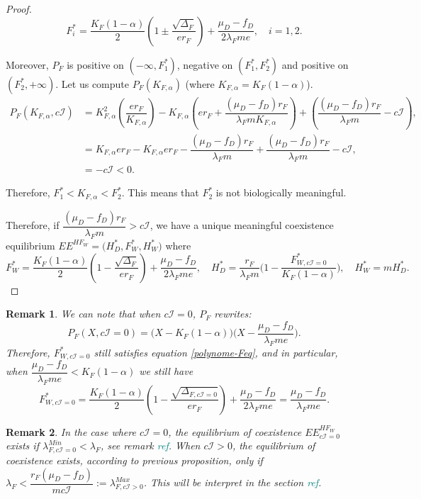 \documentclass{article}
\newcommand{\lfw}{\lambda_{F}}
\newcommand{\lfw}{\lambda_{F}}
\newcommand{\marc}[1]{\textcolor{teal}{#1}}
\newtheorem{remark}{Remark}
\begin{document}
\begin{proof}
\begin{equation*}
F_i^* = \dfrac{K_F(1-\alpha)}{2}\left(1 \pm \dfrac{\sqrt{\Delta_F}}{er_F}\right) + \dfrac{\mu_D - f_D}{2\lfw m e}, \quad i=1,2.
\end{equation*}

Moreover, $P_F$ is positive on $(-\infty, F_1^*)$, negative on $(F^*_1, F^*_2)$ and positive on $(F^*_2, +\infty)$. Let us compute $P_F(K_{F,\alpha})$ (where $ K_{F,\alpha} = K_F(1-\alpha)$).
\begin{align*}
P_F(K_{F,\alpha},c\mathcal{I}) &= K_{F,\alpha}^2 \left(\dfrac{er_F}{K_{F,\alpha}} \right) - K_{F,\alpha} \left(er_F + \dfrac{(\mu_D - f_D) r_F}{\lfw m K_{F,\alpha}} \right) + \left(\dfrac{(\mu_D - f_D) r_F}{\lfw m} - c\mathcal{I} \right), \\
&= K_{F,\alpha}er_F - K_{F,\alpha}er_F - \dfrac{(\mu_D - f_D) r_F}{\lfw m} + \dfrac{(\mu_D - f_D) r_F}{\lfw m} - c\mathcal{I}, \\
&= -c\mathcal{I}< 0.
\end{align*}

Therefore, $F_1^* < K_{F, \alpha} < F_2^*$. This means that $F_2^*$ is not biologically meaningful.

Therefore, if $\dfrac{(\mu_D - f_D) r_F}{\lfw m} > c\mathcal{I}$, we have a unique meaningful coexistence equilibrium $EE^{HF_W} = \Big(H^*_{D}, F^*_{W}, H^*_{W} \Big)$  
where $$F^*_{W} = \dfrac{K_F(1-\alpha)}{2}\left(1 - \dfrac{\sqrt{\Delta_F}}{er_F}\right) + \dfrac{\mu_D - f_D}{2\lfw m e},\quad
H^*_{D} = \dfrac{r_F}{\lfw m} \Big(1 - \dfrac{F^*_{W, c\mathcal{I} = 0}}{K_F(1-\alpha)} \Big),
\quad 
H^*_{W} = m H^*_{D}.$$
\end{proof}

\begin{remark} \label{RemarqueSimilariteEqCoexistence}
We can note that when $c\mathcal{I}=0$, $P_F$ rewrites:
$$
P_F(X, c\mathcal{I}=0) = \Big(X-K_F(1-\alpha) \Big) \Big(X - \dfrac{\mu_D - f_D}{\lfw m e} \Big).
$$
Therefore, $F^*_{W,c\mathcal{I} =0}$ still satisfies equation \eqref{polynome-Feq}, and in particular, when $\dfrac{\mu_D - f_D}{\lfw m e} < K_F(1-\alpha)$ we still have
$$
F^*_{W, c\mathcal{I} =0} = \dfrac{K_F(1-\alpha)}{2}\left(1 - \dfrac{\sqrt{\Delta_{F, c\mathcal{I} = 0}}}{er_F}\right) + \dfrac{\mu_D - f_D}{2\lfw m e} = \dfrac{\mu_D - f_D}{\lfw m e}.
$$ 
\end{remark}


\begin{remark}
In the case where $c\mathcal{I} = 0$, the equilibrium of coexistence $EE^{HF_W}_{c\mathcal{I}=0}$ exists if $\lambda_{F, c\mathcal{I}=0}^{Min} < \lfw$, see remark \marc{ref}. When $c\mathcal{I} > 0$, the equilibrium of coexistence exists, according to previous proposition, only if $\lfw < \dfrac{r_F(\mu_D - f_D)}{m c \mathcal{I}} := \lambda_{F, c\mathcal{I}>0}^{Max}$. This will be interpret in the section \marc{ref}.
\end{remark}
\end{document}
